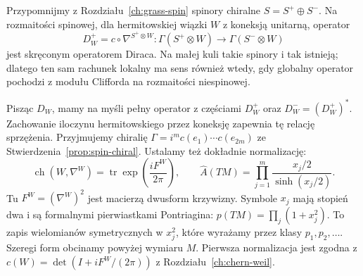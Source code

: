 Przypomnijmy z Rozdziału~\ref{ch:grass-spin}
spinory chiralne \(S=S^+\oplus S^-\).
Na rozmaitości spinowej, dla hermitowskiej wiązki
\(W\) z koneksją unitarną, operator
\[
 D_W^+=c\circ\nabla^{S^+\otimes W}:
 \Gamma(S^+\otimes W)\longrightarrow
 \Gamma(S^-\otimes W)
\]
jest skręconym operatorem Diraca. Na małej kuli
takie spinory i tak istnieją; dlatego ten sam
rachunek lokalny ma sens również wtedy, gdy
globalny operator pochodzi z modułu Clifforda
na rozmaitości niespinowej.

Pisząc $D_W$, mamy na myśli pełny operator z częściami
$D_W^+$ oraz $D_W^-=(D_W^+)^*$.
Zachowanie iloczynu hermitowskiego przez koneksję
zapewnia tę relację sprzężenia.
Przyjmujemy chiralię
$\Gamma=i^m c(e_1)\cdots c(e_{2m})$
ze Stwierdzenia~\ref{prop:spin-chiral}.
Ustalamy też dokładnie normalizację:
\[
 \operatorname{ch}(W,\nabla^W)
 =\operatorname{tr}\exp\!\left(\frac{iF^W}{2\pi}\right),\qquad
 \widehat A(TM)=\prod_{j=1}^m\frac{x_j/2}{\sinh(x_j/2)}.
\]
Tu $F^W=(\nabla^W)^2$ jest macierzą dwusform krzywizny.
Symbole $x_j$ mają stopień dwa i są formalnymi
pierwiastkami Pontriagina: $p(TM)=\prod_j(1+x_j^2)$.
To zapis wielomianów symetrycznych w $x_j^2$,
które wyrażamy przez klasy $p_1,p_2,\ldots$.
Szeregi form obcinamy powyżej wymiaru $M$.
Pierwsza normalizacja jest zgodna z
$c(W)=\det(I+iF^W/(2\pi))$ z Rozdziału~\ref{ch:chern-weil}.


